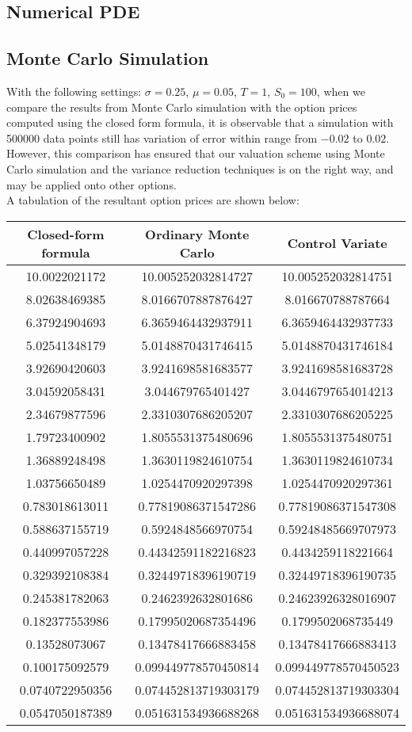 \subsection{Numerical PDE}
\newpage
\subsection{Monte Carlo Simulation}
With the following settings: $\sigma = 0.25$, $\mu = 0.05$, $T = 1$, $S_{0} = 100$, 
when we compare the results from Monte Carlo simulation with the option prices computed using the closed form formula, it is observable that a simulation with 500000 data points still has variation of error within range from $-0.02$ to $0.02$. However, this comparison has ensured that our valuation scheme using Monte Carlo simulation and the variance reduction techniques is on the right way, and may be applied onto other options.\\
A tabulation of the resultant option prices are shown below:
\begin{center}
\begin{tabular}{|c|c|c|}
\hline
Closed-form formula & Ordinary Monte Carlo & Control Variate\\
\hline
10.0022021172&10.005252032814727& 10.005252032814751\\
8.02638469385&8.0166707887876427& 8.016670788787664\\ 
6.37924904693&6.3659464432937911& 6.3659464432937733\\ 
5.02541348179&5.0148870431746415& 5.0148870431746184\\
3.92690420603&3.9241698581683577& 3.9241698581683728\\
3.04592058431&3.044679765401427&  3.0446797654014213\\
2.34679877596&2.3310307686205207& 2.3310307686205225\\
1.79723400902&1.8055531375480696& 1.8055531375480751\\
1.36889248498&1.3630119824610754& 1.3630119824610734\\
1.03756650489&1.0254470920297398& 1.0254470920297361\\
0.783018613011&0.77819086371547286&0.77819086371547308\\
0.588637155719&0.5924848566970754& 0.59248485669707973\\
0.440997057228&0.44342591182216823&0.4434259118221664\\
0.329392108384&0.32449718396190719&0.32449718396190735\\
0.245381782063&0.2462392632801686& 0.24623926328016907\\
0.182377553986&0.17995020687354496&0.1799502068735449\\
0.13528073067&0.13478417666883458&0.13478417666883413\\
0.100175092579&0.099449778570450814&0.099449778570450523\\
0.0740722950356&0.074452813719303179&0.074452813719303304\\
0.0547050187389&0.051631534936688268&0.051631534936688074\\
\hline
\end{tabular}
\end{center}
\newpage

